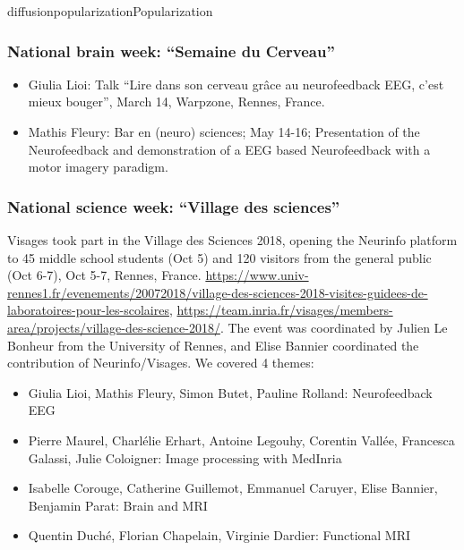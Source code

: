 \documentclass{ra2018}
\begin{document}
\begin{module}{diffusion}{popularization}{Popularization}
\subsubsection{National brain week: ``Semaine du Cerveau''}
\begin{itemize}
    \item Giulia Lioi: Talk ``Lire dans son cerveau grâce au neurofeedback EEG, c’est mieux bouger'', March 14, Warpzone, Rennes, France. 
    \item Mathis Fleury: Bar en (neuro) sciences; May 14-16; Presentation of the Neurofeedback and demonstration of a EEG based Neurofeedback with a motor imagery paradigm. 
\end{itemize}

\subsubsection{National science week: ``Village des sciences''}
Visages took part in the Village des Sciences 2018, opening the Neurinfo platform to 45 middle school students (Oct 5) and 120 visitors from the general public (Oct 6-7), Oct 5-7, Rennes, France. \url{https://www.univ-rennes1.fr/evenements/20072018/village-des-sciences-2018-visites-guidees-de-laboratoires-pour-les-scolaires}, \url{https://team.inria.fr/visages/members-area/projects/village-des-science-2018/}. The event was coordinated by Julien Le Bonheur from the University of Rennes, and Elise Bannier coordinated the contribution of Neurinfo/Visages. We covered 4 themes: 
\begin{itemize}
        \item Giulia Lioi, Mathis Fleury, Simon Butet, Pauline Rolland: Neurofeedback EEG
        \item Pierre Maurel, Charlélie Erhart, Antoine Legouhy, Corentin Vallée, Francesca Galassi, Julie Coloigner: Image processing with MedInria
        \item Isabelle Corouge, Catherine Guillemot, Emmanuel Caruyer, Elise Bannier, Benjamin Parat: Brain and MRI
        \item Quentin Duché, Florian Chapelain, Virginie Dardier: Functional MRI
\end{itemize}


\end{module}
\end{document}
